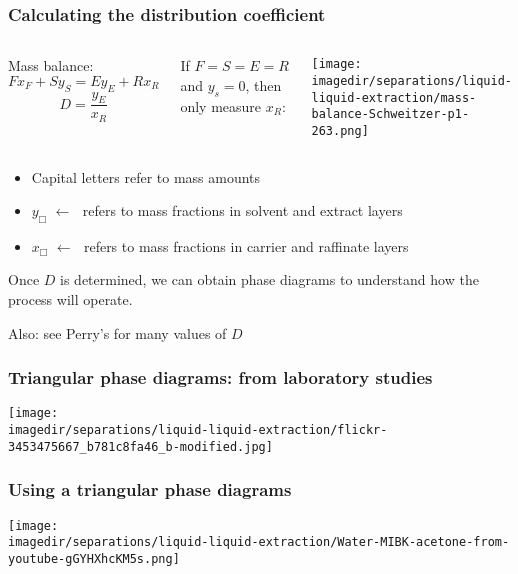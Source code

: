 \begin{frame}\frametitle{Calculating the distribution coefficient {\color{myOrange}{(in the lab only)}}}
	\begin{columns}[t]
			Mass balance:
			\[ F x_F + S y_S = E y_E + R x_R \]
			\[ D = \frac{y_E}{x_R} \]

			\vspace{12pt}
			If $F = S = E = R$ and $y_s = 0$, then only measure $x_R$:

			\begin{center}
				\texttt{[image: \\imagedir/separations/liquid-liquid-extraction/mass-balance-Schweitzer-p1-263.png]}
			\end{center}
	\end{columns}
	\begin{itemize}
		\item	Capital letters refer to mass amounts
		\item	$y_\Box \,\, \leftarrow\,\,$  refers to mass fractions in solvent and extract layers
		\item	$x_\Box \,\, \leftarrow\,\,$  refers to mass fractions in carrier and raffinate layers
	\end{itemize}
	Once $D$ is determined, we can obtain phase diagrams to understand how the process will operate.

	\vspace{12pt}
	Also: see Perry's for many values of $D$
\end{frame}

\begin{frame}\frametitle{Triangular phase diagrams: from laboratory studies}
	\begin{center}
		\texttt{[image: \\imagedir/separations/liquid-liquid-extraction/flickr-3453475667\_b781c8fa46\_b-modified.jpg]}
	\end{center}
	\vspace{-12pt}
\end{frame}

\begin{frame}\frametitle{Using a triangular phase diagrams}
	\begin{center}
		\texttt{[image: \\imagedir/separations/liquid-liquid-extraction/Water-MIBK-acetone-from-youtube-gGYHXhcKM5s.png]}
	\end{center}
	\vspace{-12pt}
\end{frame}


